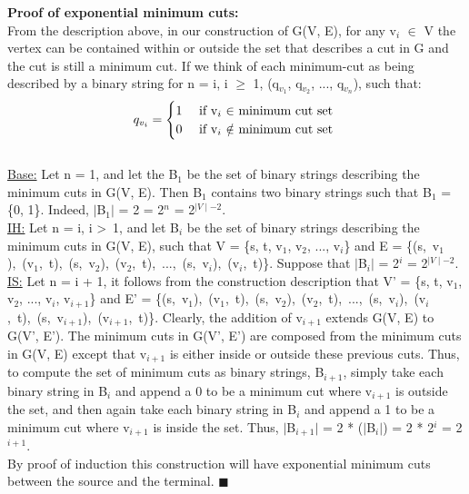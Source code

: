 \documentclass[10pt]{csc_assignment}
\begin{document}
\begin{description}
\textbf{Proof of exponential minimum cuts:}\\
From the description above, in our construction of G(V, E), for any v$_{i}$ $\in$ V the vertex can be contained within or outside the set that describes a cut in G and the cut is still a minimum cut. If we think of each minimum-cut as being described by a binary string for n = i, i $\geqslant$ 1, (q$_{v_{1}}$, q$_{v_{2}}$, ..., q$_{v_{n}}$), such that:
\[
 q_{v_{i}} = 
\begin{cases} 
      \hfill 1 \hfill & \text{ if v$_{i}$ $\in$ minimum cut set }\\
      \hfill 0 \hfill & \text{ if v$_{i}$ $\notin$ minimum cut set} \\
  \end{cases}
\]\\
\underline{Base:} Let n = 1, and let the B$_{1}$ be the set of binary strings describing the minimum cuts in G(V, E). Then B$_{1}$ contains two binary strings such that B$_{1}$ = \{0, 1\}.
Indeed, $\mid$B$_{1}$$\mid$ = 2 = 2$^{n}$ = 2$^{\mid V \mid - 2}$.\\
\underline{IH:} Let n = i, i \textgreater ~1, and let B$_{i}$ be the set of binary strings describing the minimum cuts in G(V, E), such that V = 
\{s, t, v$_{1}$, v$_{2}$, ..., v$_{i}$\} and E = \mbox{\{(s, v$_{1}$), (v$_{1}$, t), (s, v$_{2}$), (v$_{2}$, t), ..., (s, v$_{i}$), (v$_{i}$, t)\}}. Suppose that $\mid$B$_{i}$$\mid$ = 2$^{i}$ = 2$^{\mid V \mid - 2}$.
\\
\underline{IS:} Let n = i + 1, it follows from the construction description that V' = 
\{s, t, v$_{1}$, v$_{2}$, ..., v$_{i}$, v$_{i + 1}$\} and E' = \mbox{\{(s, v$_{1}$), (v$_{1}$, t), (s, v$_{2}$), (v$_{2}$, t), ..., (s, v$_{i}$), (v$_{i}$, t), (s, v$_{i + 1}$), (v$_{i + 1}$, t)\}}. Clearly, the addition of v$_{i + 1}$ extends G(V, E) to G(V', E'). The minimum cuts in G(V', E') are composed from the minimum cuts in G(V, E) except that v$_{i + 1}$ is either inside or outside these previous cuts. Thus, to compute the set of minimum cuts as binary strings, B$_{i + 1}$, simply take each binary string in B$_{i}$ and append a 0 to be a minimum cut where v$_{i + 1}$ is outside the set, and then again take each binary string in B$_{i}$ and append a 1 to be a minimum cut where v$_{i + 1}$ is inside the set. Thus, $\mid$B$_{i + 1}$$\mid$ = 2 * ($\mid$B$_{i}$$\mid$) = 2 * 2$^{i}$ = 2$^{i + 1}$.
\\
By proof of induction this construction will have exponential minimum cuts between the source and the terminal. $\blacksquare$
\\


\end{description}
\end{document}
